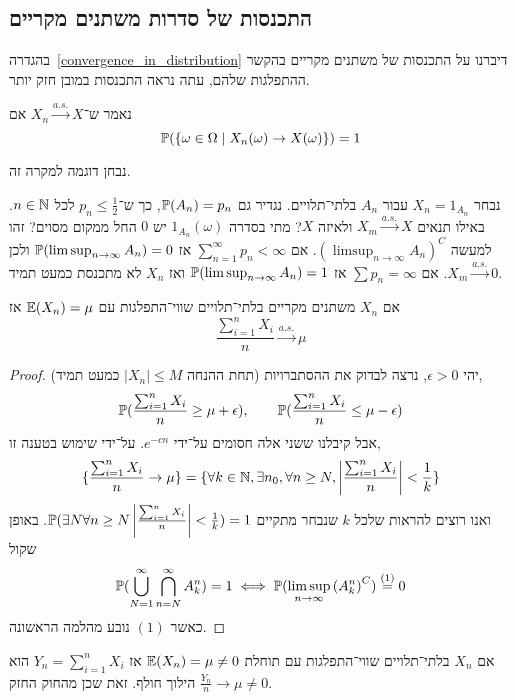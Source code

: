 \subsection{התכנסות של סדרות משתנים מקריים}
בהגדרה\ \ref{convergence_in_distribution} דיברנו על התכנסות של משתנים מקריים בהקשר ההתפלגות שלהם, עתה נראה התכנסות במובן חזק יותר.
\begin{definition}
	נאמר ש־$X_n \xrightarrow{a.s.} X$ אם
	\[
		\mathbb{P}(\{ \omega \in \Omega \mid X_n(\omega) \to X(\omega) \}) = 1
	\]
\end{definition}
נבחן דוגמה למקרה זה.
\begin{example}
	נבחר $X_n = 1_{A_n}$ עבור $A_n$ בלתי־תלויים.
	נגדיר גם $\mathbb{P}(A_n) = p_n$, כך ש־$p_n \le \frac{1}{2}$ לכל $n \in \mathbb{N}$.
	באילו תנאים $X_m \xrightarrow{a.s.} X$ ולאיזה $X$?
	מתי בסדרה $1_{A_n}(\omega)$ יש $0$ החל ממקום מסוים?
	זהו למעשה ${(\limsup_{n \to \infty} A_n)}^C$.
	אם $\sum_{n = 1}^{\infty} p_n < \infty$ אז $\mathbb{P}(\limsup_{n \to \infty} A_n) = 0$ ולכן $X_m \xrightarrow{a.s.} 0$.
	אם $\sum p_n = \infty$ אז $\mathbb{P}(\limsup_{n \to \infty} A_n) = 1$ ואז $X_n$ לא מתכנסת כמעט תמיד.
\end{example}
\begin{theorem}
	אם $X_n$ משתנים מקריים בלתי־תלויים שווי־התפלגות עם $\mathbb{E}(X_n) = \mu$ אז
	\[
		\frac{\sum_{i = 1}^{n} X_i}{n} \xrightarrow{a.s.} \mu
	\]
\end{theorem}
\begin{proof} (תחת ההנחה $|X_n| \le M$ כמעט תמיד)
	יהי $\epsilon > 0$,
	נרצה לבדוק את ההסתברויות,
	\[
		\mathbb{P}(\frac{\sum_{i = 1}^{n} X_i}{n} \ge \mu + \epsilon),
		\qquad
		\mathbb{P}(\frac{\sum_{i = 1}^{n} X_i}{n} \le \mu - \epsilon)
	\]
	אבל קיבלנו ששני אלה חסומים על־ידי $e^{-cn}$.
	על־ידי שימוש בטענה זו,
	\[
		\{ \frac{\sum_{i = 1}^{n} X_i}{n} \to \mu \}
		= \{ \forall k \in \mathbb{N}, \exists n_0, \forall n \ge N, \left\lvert \frac{\sum_{i = 1}^{n} X_i}{n} \right\rvert < \frac{1}{k} \}
	\]
	ואנו רוצים להראות שלכל $k$ שנבחר מתקיים $\mathbb{P}(\exists N \forall n \ge N \left\lvert \frac{\sum_{i = 1}^{n} X_i}{n} \right\rvert < \frac{1}{k}) = 1$.
	באופן שקול
	\[
		\mathbb{P}(\bigcup_{N = 1}^\infty \bigcap_{n = N}^\infty A_k^n) = 1
		\iff
		\mathbb{P}(\limsup_{n \to \infty} {(A_k^n)}^C) \overset{(1)}{=} 0
	\]
	כאשר $(1)$ נובע מהלמה הראשונה.
\end{proof}
\begin{conclusion}
	אם $X_n$ בלתי־תלויים שווי־התפלגות עם תוחלת $\mathbb{E}(X_n) = \mu \ne 0$ אז $Y_n = \sum_{i = 1}^{n} X_i$ הוא הילוך חולף.
	זאת שכן מהחוק החזק $\frac{Y_n}{n} \to \mu \ne 0$.
\end{conclusion}

\listoftheorems[title=הגדרות ומשפטים,ignoreall,show={theorem,definition},swapnumber,onlynamed={proposition}]

